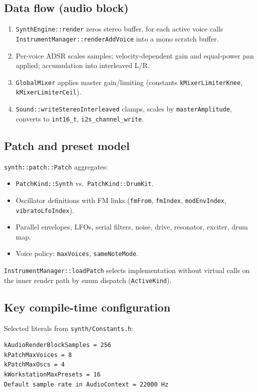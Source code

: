 \documentclass[11pt,a4paper]{article}
\begin{document}
\subsection{Data flow (audio block)}
\begin{enumerate}[noitemsep]
  \item \texttt{SynthEngine::render} zeros stereo buffer, for each active voice calls \texttt{InstrumentManager::renderAddVoice} into a mono scratch buffer.
  \item Per-voice ADSR scales samples; velocity-dependent gain and equal-power pan applied; accumulation into interleaved L/R.
  \item \texttt{GlobalMixer} applies master gain/limiting (constants \texttt{kMixerLimiterKnee}, \texttt{kMixerLimiterCeil}).
  \item \texttt{Sound::writeStereoInterleaved} clamps, scales by \texttt{masterAmplitude}, converts to \texttt{int16\_t}, \texttt{i2s\_channel\_write}.
\end{enumerate}

\subsection{Patch and preset model}
\texttt{synth::patch::Patch} aggregates:
\begin{itemize}[noitemsep]
  \item \texttt{PatchKind::Synth} vs.\ \texttt{PatchKind::DrumKit}.
  \item Oscillator definitions with FM links (\texttt{fmFrom}, \texttt{fmIndex}, \texttt{modEnvIndex}, \texttt{vibratoLfoIndex}).
  \item Parallel envelopes, LFOs, serial filters, noise, drive, resonator, exciter, drum map.
  \item Voice policy: \texttt{maxVoices}, \texttt{sameNoteMode}.
\end{itemize}
\texttt{InstrumentManager::loadPatch} selects implementation without virtual calls on the inner render path by enum dispatch (\texttt{ActiveKind}).

\subsection{Key compile-time configuration}
Selected literals from \texttt{synth/Constants.h}:
\begin{lstlisting}
kAudioRenderBlockSamples = 256
kPatchMaxVoices = 8
kPatchMaxOscs = 4
kWorkstationMaxPresets = 16
Default sample rate in AudioContext = 22000 Hz
\end{lstlisting}
\end{document}
